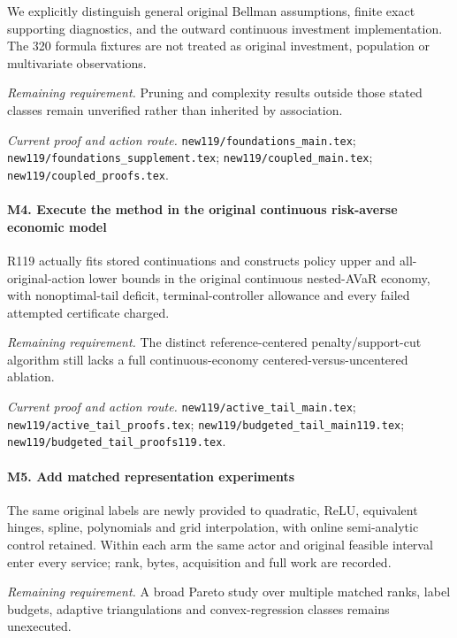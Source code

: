 We explicitly distinguish general original Bellman assumptions, finite exact supporting diagnostics, and the outward continuous investment implementation. The 320 formula fixtures are not treated as original investment, population or multivariate observations.

\par\emph{Remaining requirement.} Pruning and complexity results outside those stated classes remain unverified rather than inherited by association.

\par\emph{Current proof and action route.} \nolinkurl{new119/foundations_main.tex}; \nolinkurl{new119/foundations_supplement.tex}; \nolinkurl{new119/coupled_main.tex}; \nolinkurl{new119/coupled_proofs.tex}.

\paragraph{M4. Execute the method in the original continuous risk-averse economic model}

R119 actually fits stored continuations and constructs policy upper and all-original-action lower bounds in the original continuous nested-AVaR economy, with nonoptimal-tail deficit, terminal-controller allowance and every failed attempted certificate charged.

\par\emph{Remaining requirement.} The distinct reference-centered penalty/\allowbreak{}support-cut algorithm still lacks a full continuous-economy centered-versus-uncentered ablation.

\par\emph{Current proof and action route.} \nolinkurl{new119/active_tail_main.tex}; \nolinkurl{new119/active_tail_proofs.tex}; \nolinkurl{new119/budgeted_tail_main119.tex}; \nolinkurl{new119/budgeted_tail_proofs119.tex}.

\paragraph{M5. Add matched representation experiments}

The same original labels are newly provided to quadratic, ReLU, equivalent hinges, spline, polynomials and grid interpolation, with online semi-analytic control retained. Within each arm the same actor and original feasible interval enter every service; rank, bytes, acquisition and full work are recorded.

\par\emph{Remaining requirement.} A broad Pareto study over multiple matched ranks, label budgets, adaptive triangulations and convex-regression classes remains unexecuted.


